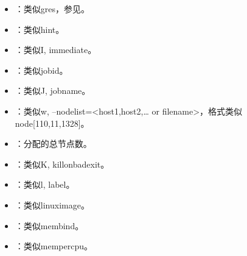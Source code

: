 \documentclass[a4paper,12pt,english]{sphinxmanual}
\begin{document}
\begin{itemize}
\item {} 
\sphinxAtStartPar
{}：类似\sphinxhyphen{}\sphinxhyphen{}gres，参见。

\item {} 
\sphinxAtStartPar
{}：类似\sphinxhyphen{}\sphinxhyphen{}hint。

\item {} 
\sphinxAtStartPar
{}：类似\sphinxhyphen{}I, \sphinxhyphen{}\sphinxhyphen{}immediate。

\item {} 
\sphinxAtStartPar
{}：类似\sphinxhyphen{}\sphinxhyphen{}jobid。

\item {} 
\sphinxAtStartPar
{}：类似\sphinxhyphen{}J, \sphinxhyphen{}\sphinxhyphen{}job\sphinxhyphen{}name。

\item {} 
\sphinxAtStartPar
{}：类似\sphinxhyphen{}w, –nodelist=<host1,host2,… or filename>，格式类似node{[}1\sphinxhyphen{}10,11,13\sphinxhyphen{}28{]}。

\item {} 
\sphinxAtStartPar
{}：分配的总节点数。

\item {} 
\sphinxAtStartPar
{}：类似\sphinxhyphen{}K, \sphinxhyphen{}\sphinxhyphen{}kill\sphinxhyphen{}on\sphinxhyphen{}bad\sphinxhyphen{}exit。

\item {} 
\sphinxAtStartPar
{}：类似\sphinxhyphen{}l, \sphinxhyphen{}\sphinxhyphen{}label。

\item {} 
\sphinxAtStartPar
{}：类似\sphinxhyphen{}\sphinxhyphen{}linux\sphinxhyphen{}image。

\item {} 
\sphinxAtStartPar
{}：类似\sphinxhyphen{}\sphinxhyphen{}mem\sphinxhyphen{}bind。

\item {} 
\sphinxAtStartPar
{}：类似\sphinxhyphen{}\sphinxhyphen{}mem\sphinxhyphen{}per\sphinxhyphen{}cpu。


\end{itemize}
\end{document}
